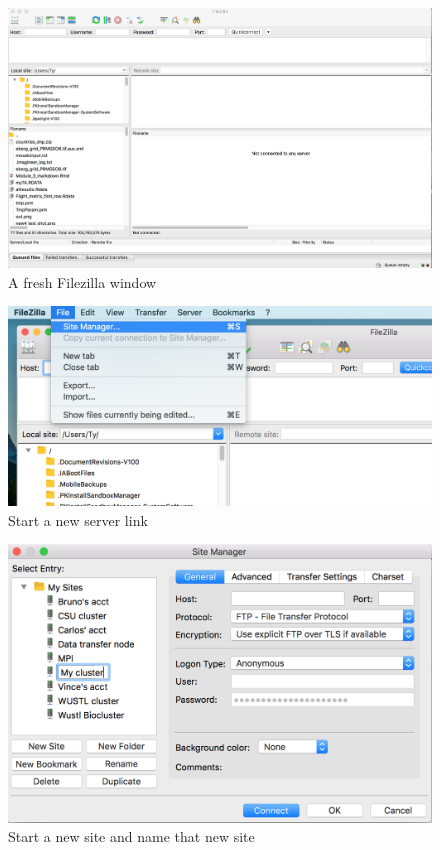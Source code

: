 \documentclass[]{book}
\theoremstyle{definition}
\theoremstyle{definition}
\theoremstyle{definition}
\theoremstyle{remark}
\begin{document}
\begin{figure}
\centering
\includegraphics{Filezilla.png}
\caption{A fresh Filezilla window}
\end{figure}

\begin{figure}
\centering
\includegraphics{site manager.png}
\caption{Start a new server link}
\end{figure}

\begin{figure}
\centering
\includegraphics{New site name.png}
\caption{Start a new site and name that new site}
\end{figure}
\end{document}
